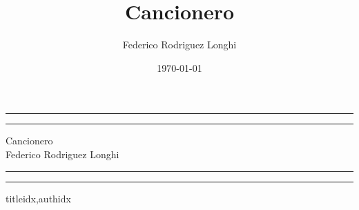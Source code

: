 \documentclass[12pt,a4paper]{article}
\newcommand{\autor}{Federico Rodriguez Longhi}
\begin{document}
\title{Cancionero}
\author{Federico Rodriguez Longhi}		
\date{\today}

\begin{titlepage}
\centering
\rule{\textwidth}{1pt}\par
\vspace{2pt}\vspace{-\baselineskip}
\rule{\textwidth}{0.4pt}\par
\vspace{20pt}
\Huge{Cancionero}\\
\vfill
\large{\autor}
\vspace{20pt}\\
\rule{\textwidth}{0.4pt}\par
\vspace{2pt}\vspace{-\baselineskip}
\rule{\textwidth}{1pt}\par
\end{titlepage}

\begin{songs}{titleidx,authidx}

\end{songs}
\end{document}
